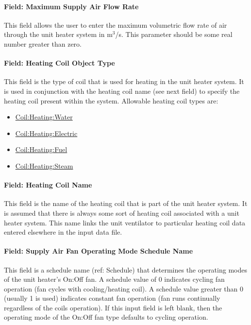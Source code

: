 \paragraph{Field: Maximum Supply Air Flow Rate}\label{field-maximum-supply-air-flow-rate-2}

This field allows the user to enter the maximum volumetric flow rate of air through the unit heater system in m\(^{3}\)/s. This parameter should be some real number greater than zero.

\paragraph{Field: Heating Coil Object Type}\label{field-heating-coil-object-type-2-000}

This field is the type of coil that is used for heating in the unit heater system. It is used in conjunction with the heating coil name (see next field) to specify the heating coil present within the system. Allowable heating coil types are:

\begin{itemize}
\item
  \hyperref[coilheatingwater]{Coil:Heating:Water}
\item
  \hyperref[coilheatingelectric]{Coil:Heating:Electric}
\item
  \hyperref[coilheatinggas-000]{Coil:Heating:Fuel}
\item
  \hyperref[coilheatingsteam]{Coil:Heating:Steam}
\end{itemize}

\paragraph{Field: Heating Coil Name}\label{field-heating-coil-name-2-000}

This field is the name of the heating coil that is part of the unit heater system. It is assumed that there is always some sort of heating coil associated with a unit heater system. This name links the unit ventilator to particular heating coil data entered elsewhere in the input data file.

\paragraph{Field: Supply Air Fan Operating Mode Schedule Name}\label{field-supply-air-fan-operating-mode-schedule-name-2-000}

This field is a schedule name (ref: Schedule) that determines the operating modes of the unit heater's On:Off fan. A schedule value of 0 indicates cycling fan operation (fan cycles with cooling/heating coil). A schedule value greater than 0 (usually 1 is used) indicates constant fan operation (fan runs continually regardless of the coils operation). If this input field is left blank, then the operating mode of the On:Off fan type defaults to cycling operation.

